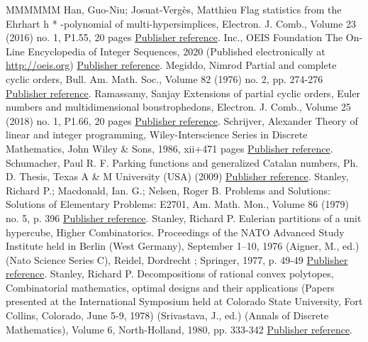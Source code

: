 \documentclass[11pt]{article}
\theoremstyle{definition}
\numberwithin{equation}{section}
\numberwithin{figure}{section}
\numberwithin{table}{section}
\begin{document}
\begin{thebibliography}{MMMMMM}
 Han, Guo-Niu; Josuat-Vergès, Matthieu Flag statistics from the Ehrhart h * -polynomial of multi-hypersimplices, Electron. J. Comb., Volume 23 (2016) no. 1, P1.55, 20 pages \href{https://ahl.centre-mersenne.org/item/AHL_2020__3__275_0/#HJV16}{Publisher reference}.
 Inc., OEIS Foundation The On-Line Encyclopedia of Integer Sequences, 2020 (Published electronically at \url{http://oeis.org}) \href{https://ahl.centre-mersenne.org/item/AHL_2020__3__275_0/#OEIS}{Publisher reference}.
 Megiddo, Nimrod Partial and complete cyclic orders, Bull. Am. Math. Soc., Volume 82 (1976) no. 2, pp. 274-276 \href{https://ahl.centre-mersenne.org/item/AHL_2020__3__275_0/#M76}{Publisher reference}.
 Ramassamy, Sanjay Extensions of partial cyclic orders, Euler numbers and multidimensional boustrophedons, Electron. J. Comb., Volume 25 (2018) no. 1, P1.66, 20 pages \href{https://ahl.centre-mersenne.org/item/AHL_2020__3__275_0/#R17}{Publisher reference}.
 Schrijver, Alexander Theory of linear and integer programming, Wiley-Interscience Series in Discrete Mathematics, John Wiley \& Sons, 1986, xii+471 pages \href{https://ahl.centre-mersenne.org/item/AHL_2020__3__275_0/#schrijver-1986}{Publisher reference}.
 Schumacher, Paul R. F. Parking functions and generalized Catalan numbers, Ph. D. Thesis, Texas A \& M University (USA) (2009) \href{https://ahl.centre-mersenne.org/item/AHL_2020__3__275_0/#schumacher-2009}{Publisher reference}.
 Stanley, Richard P.; Macdonald, Ian. G.; Nelsen, Roger B. Problems and Solutions: Solutions of Elementary Problems: E2701, Am. Math. Mon., Volume 86 (1979) no. 5, p. 396 \href{https://ahl.centre-mersenne.org/item/AHL_2020__3__275_0/#SMN79}{Publisher reference}.
 Stanley, Richard P. Eulerian partitions of a unit hypercube, Higher Combinatorics. Proceedings of the NATO Advanced Study Institute held in Berlin (West Germany), September 1–10, 1976 (Aigner, M., ed.) (Nato Science Series C), Reidel, Dordrecht ; Springer, 1977, p. 49-49 \href{https://ahl.centre-mersenne.org/item/AHL_2020__3__275_0/#Sta77}{Publisher reference}.
 Stanley, Richard P. Decompositions of rational convex polytopes, Combinatorial mathematics, optimal designs and their applications (Papers presented at the International Symposium held at Colorado State University, Fort Collins, Colorado, June 5-9, 1978) (Srivastava, J., ed.) (Annals of Discrete Mathematics), Volume 6, North-Holland, 1980, pp. 333-342 \href{https://ahl.centre-mersenne.org/item/AHL_2020__3__275_0/#S80}{Publisher reference}.

\end{thebibliography}
\end{document}
